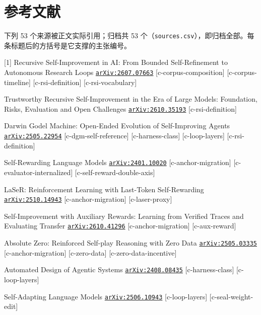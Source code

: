 \section*{参考文献}
\begingroup
\scriptsize
\setlength{\parindent}{0pt}
\setlength{\parskip}{1.6pt}
\begin{refs}
\noindent 下列 53 个来源被正文实际引用；归档共 53 个（\texttt{sources.csv}），即归档全部。每条标题后的方括号是它支撑的主张编号。\par
\vspace{3pt}
[1] Recursive Self-Improvement in AI: From Bounded Self-Refinement to Autonomous Research Loops \href{https://arxiv.org/abs/2607.07663}{\texttt{arXiv:2607.07663}} [c-corpus-composition] [c-corpus-timeline] [c-rsi-definition] [c-rsi-vocabulary]\par
[2] Trustworthy Recursive Self-Improvement in the Era of Large Models: Foundation, Risks, Evaluation and Open Challenges \href{https://arxiv.org/abs/2610.35193}{\texttt{arXiv:2610.35193}} [c-rsi-definition]\par
[3] Darwin Godel Machine: Open-Ended Evolution of Self-Improving Agents \href{https://arxiv.org/abs/2505.22954}{\texttt{arXiv:2505.22954}} [c-dgm-self-reference] [c-harness-class] [c-loop-layers] [c-rsi-definition]\par
[4] Self-Rewarding Language Models \href{https://arxiv.org/abs/2401.10020}{\texttt{arXiv:2401.10020}} [c-anchor-migration] [c-evaluator-internalized] [c-self-reward-double-axis]\par
[5] LaSeR: Reinforcement Learning with Last-Token Self-Rewarding \href{https://arxiv.org/abs/2510.14943}{\texttt{arXiv:2510.14943}} [c-anchor-migration] [c-laser-proxy]\par
[6] Self-Improvement with Auxiliary Rewards: Learning from Verified Traces and Evaluating Transfer \href{https://arxiv.org/abs/2610.41296}{\texttt{arXiv:2610.41296}} [c-anchor-migration] [c-aux-reward]\par
[7] Absolute Zero: Reinforced Self-play Reasoning with Zero Data \href{https://arxiv.org/abs/2505.03335}{\texttt{arXiv:2505.03335}} [c-anchor-migration] [c-zero-data] [c-zero-data-incentive]\par
[8] Automated Design of Agentic Systems \href{https://arxiv.org/abs/2408.08435}{\texttt{arXiv:2408.08435}} [c-harness-class] [c-loop-layers]\par
[9] Self-Adapting Language Models \href{https://arxiv.org/abs/2506.10943}{\texttt{arXiv:2506.10943}} [c-loop-layers] [c-seal-weight-edit]\par

\end{refs}
